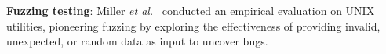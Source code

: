 






{\bf Fuzzing testing}:
Miller {\em et al.}~\cite{miller1995fuzz} conducted an empirical
evaluation on UNIX utilities, pioneering fuzzing by exploring the effectiveness of providing
invalid, unexpected, or random data as input to uncover bugs.

